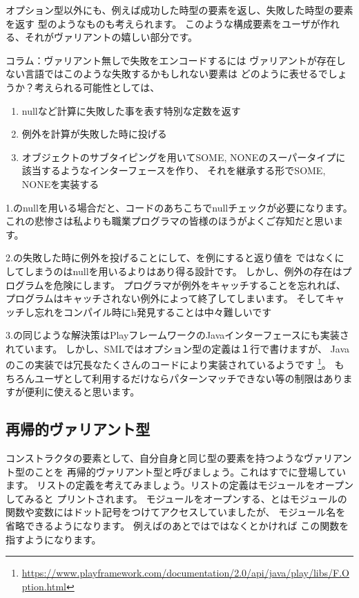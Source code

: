 \documentclass[11pt,a4paper]{jarticle}
\begin{document}
オプション型以外にも、例えば成功した時型の要素を返し、失敗した時型の要素を返す
型のようなものも考えられます。
このような構成要素をユーザが作れる、それがヴァリアントの嬉しい部分です。

\begin{itembox}[l]{コラム：ヴァリアント無しで失敗をエンコードするには}
ヴァリアントが存在しない言語ではこのような失敗するかもしれない要素は
どのように表せるでしょうか？考えられる可能性としては、
\begin{enumerate}
\item nullなど計算に失敗した事を表す特別な定数を返す
\item 例外を計算が失敗した時に投げる
\item オブジェクトのサブタイピングを用いてSOME, NONEのスーパータイプに該当するようなインターフェースを作り、
  それを継承する形でSOME, NONEを実装する
\end{enumerate}

1.のnullを用いる場合だと、コードのあちこちでnullチェックが必要になります。
これの悲惨さは私よりも職業プログラマの皆様のほうがよくご存知だと思います。

2.の失敗した時に例外を投げることにして、を例にすると返り値を
ではなくにしてしまうのはnullを用いるよりはあり得る設計です。
しかし、例外の存在はプログラムを危険にします。
プログラマが例外をキャッチすることを忘れれば、
プログラムはキャッチされない例外によって終了してしまいます。
そしてキャッチし忘れをコンパイル時にh発見することは中々難しいです

3.の同じような解決策はPlayフレームワークのJavaインターフェースにも実装されています。
しかし、SMLではオプション型の定義は１行で書けますが、
Javaのこの実装では冗長なたくさんのコードにより実装されているようです
\footnote{\url{https://www.playframework.com/documentation/2.0/api/java/play/libs/F.Option.html}}。
もちろんユーザとして利用するだけならパターンマッチできない等の制限はありますが便利に使えると思います。
\end{itembox}

\subsection{再帰的ヴァリアント型}

コンストラクタの要素として、自分自身と同じ型の要素を持つようなヴァリアント型のことを
再帰的ヴァリアント型と呼びましょう。これはすでに登場しています。
リストの定義を考えてみましょう。リストの定義はモジュールをオープンしてみると
プリントされます。
モジュールをオープンする、とはモジュールの関数や変数にはドット記号をつけてアクセスしていましたが、
モジュール名を省略できるようになります。
例えばのあとではではなくとかければ
この関数を指すようになります。
\end{document}
